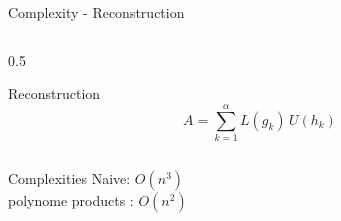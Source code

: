 \begin{frame}{Complexity - Reconstruction}
  \begin{columns}
    \begin{column}{0.5\textwidth}
      \begin{block}{Reconstruction}
        \[
          A = \sum_{k=1}^{\alpha} L(g_k)\, U(h_k)
        \]
      \end{block}
    \end{column}
  \end{columns}

  \vspace{1cm}

  \begin{block}{Complexities}
    Naive: $O(n^3)$           \\
    polynome products : $O(n^2)$
  \end{block}
  
\end{frame}